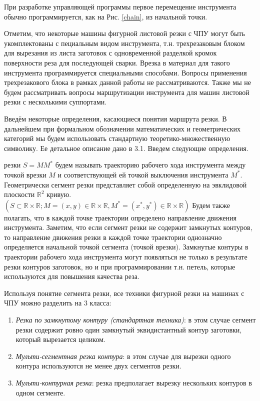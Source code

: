 \documentclass{article}
\begin{document}
При разработке управляющей программы
первое перемещение инструмента обычно
программируется, как на Рис. \ref{chain},
из начальной точки.

Отметим, что некоторые машины фигурной листовой
резки с ЧПУ могут быть укомплектованы с
пециальным видом инструмента,
т.н. трехрезаковым блоком для вырезания
из листа заготовок с одновременной разделкой
кромок поверхности реза для последующей сварки.
Врезка в материал для такого инструмента
программируется специальными способами.
Вопросы применения трехрезакового блока
в рамках данной работы не рассматриваются.
Также мы не будем рассматривать вопросы
маршрутизации инструмента для машин
листовой резки с несколькими суппортами.

Введём некоторые определения,
касающиеся понятия маршрута резки.
В дальнейшем при формальном обозначении
математических и геометрических категорий
мы будем использовать стандартную
теоретико-множественную символику.
Ее детальное описание дано в 3.1.
Введем следующие определения.

{ резки}
$S=MM^*$
будем называть траекторию рабочего хода
инструмента между точкой врезки
$M$
и соответствующей ей точкой выключения инструмента
$M^*$.
Геометрически сегмент резки представляет собой
определенную на эвклидовой плоскости
$\mathbb R^2$
кривую.
$(S \subset \mathbb R \times \mathbb R;
M=(x,y) \in \mathbb R \times \mathbb R,
M^* =(x^*,y^*)\in \mathbb R \times \mathbb R)$
Будем также полагать,
что в каждой точке траектории определено направление движения инструмента.
Заметим, что если сегмент резки не содержит замкнутых контуров,
то направление движения резки в каждой точке траектории
однозначно определяется начальной точкой сегмента
(точкой врезки).
Замкнутые контуры в траектории рабочего хода инструмента
могут появляться не только в результате резки контуров заготовок,
но и при программировании т.н. петель,
которые используются для повышения качества реза.

Используя понятие сегмента резки,
все техники фигурной резки на машинах с ЧПУ
можно разделить на 3 класса:
\begin{enumerate}
  \item
  {\it Резка по замкнутому контуру (стандартная техника)}:
  в этом случае сегмент резки содержит
  ровно один замкнутый эквидистантный контур заготовки,
  который вырезается целиком.
  \item
  {\it Мульти-сегментная резка контура}:
  в этом случае для вырезки одного контура
  используются не менее двух сегментов резки.
  \item
  {\it Мульти-контурная резка}:
  резка предполагает вырезку нескольких
  контуров в одном сегменте.
\end{enumerate}
\end{document}
